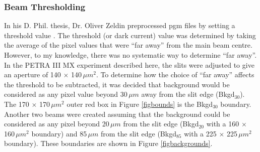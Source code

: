 \subsubsection{Beam Thresholding}
\label{secthresh}
In his D. Phil. thesis, Dr. Oliver Zeldin preprocessed pgm files by setting a threshold value \cite{zeldin2013thesis}.
The threshold (or dark current) value was determined by taking the average of the pixel values that were ``far away'' from the main beam centre.
However, to my knowledge, there was no systematic way to determine ``far away''.
In the PETRA III MX experiment described here, the slits were adjusted to give an aperture of 140 $\times$ 140$\, \mu m^{\text{2}}$.
To determine how the choice of ``far away'' affects the threshold to be subtracted, it was decided that background would be considered as any pixel value beyond 30$\,\mu m$ away from the slit edge (Bkgd$_{\text{30}}$).
The 170 $\times$ 170$\, \mu m^{\text{2}}$ outer red box in Figure \ref{figbounds} is the Bkgd$_{\text{30}}$ boundary.
Another two beams were created assuming that the background could be considered as any pixel beyond 20$\,\mu m$ from the slit edge (Bkgd$_{\text{20}}$ with a 160 $\times$ 160$\, \mu m^{\text{2}}$ boundary) and 85$\,\mu m$ from the slit edge (Bkgd$_{\text{85}}$ with a 225 $\times$ 225$\, \mu m^{\text{2}}$ boundary).
These boundaries are shown in Figure \ref{figbackgrounds}.
